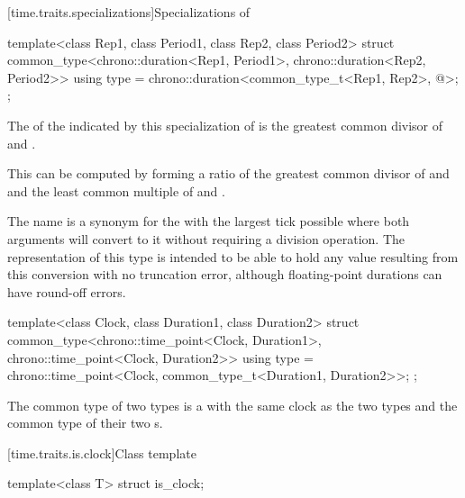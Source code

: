 [time.traits.specializations]{Specializations of }

%
\begin{itemdecl}
template<class Rep1, class Period1, class Rep2, class Period2>
  struct common_type<chrono::duration<Rep1, Period1>, chrono::duration<Rep2, Period2>> {
    using type = chrono::duration<common_type_t<Rep1, Rep2>, @\seebelow@>;
  };
\end{itemdecl}

\pnum
The  of the  indicated by this specialization of
 is the greatest common divisor of  and
.
\begin{note}
This can be computed by forming a ratio of the
greatest common divisor of  and  and the
least common multiple of  and .
\end{note}

\pnum
\begin{note}
The  name  is a synonym for the
 with the largest tick  possible where both
 arguments will convert to it without requiring a division
operation. The representation of this type is intended to be able to hold any
value resulting from this conversion with no truncation error, although
floating-point durations can have round-off errors.
\end{note}

%
\begin{itemdecl}
template<class Clock, class Duration1, class Duration2>
  struct common_type<chrono::time_point<Clock, Duration1>, chrono::time_point<Clock, Duration2>> {
    using type = chrono::time_point<Clock, common_type_t<Duration1, Duration2>>;
  };
\end{itemdecl}

\pnum
The common type of two  types is a  with the same
clock as the two types and the common type of their two s.

[time.traits.is.clock]{Class template }

%
\begin{itemdecl}
template<class T> struct is_clock;
\end{itemdecl}

